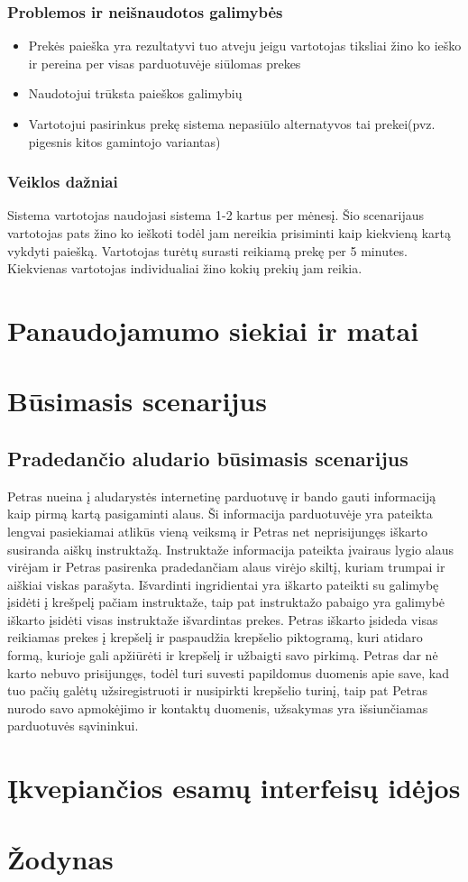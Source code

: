 \documentclass[oneside]{VUMIFPSkursinis}
\begin{document}
	\subsubsection{Problemos ir neišnaudotos galimybės}
		\begin{itemize}
			\item{Prekės paieška yra rezultatyvi tuo atveju jeigu vartotojas tiksliai žino ko ieško ir pereina per visas parduotuvėje siūlomas prekes}
			\item{Naudotojui trūksta paieškos galimybių}
			\item{Vartotojui pasirinkus prekę sistema nepasiūlo alternatyvos tai prekei(pvz. pigesnis kitos gamintojo variantas)}
		\end{itemize}
	\subsubsection{Veiklos dažniai}
		Sistema vartotojas naudojasi sistema 1-2 kartus per mėnesį.
		Šio scenarijaus vartotojas pats žino ko ieškoti todėl jam nereikia prisiminti kaip kiekvieną kartą vykdyti paiešką.
		Vartotojas turėtų surasti reikiamą prekę per 5 minutes.
		Kiekvienas vartotojas individualiai žino kokių prekių jam reikia.

\section{Panaudojamumo siekiai ir matai}

\section{Būsimasis scenarijus}
	\subsection{Pradedančio aludario būsimasis scenarijus}
		Petras nueina į aludarystės internetinę parduotuvę ir bando gauti informaciją kaip pirmą kartą pasigaminti alaus.
		Ši informacija parduotuvėje yra pateikta lengvai pasiekiamai atlikūs vieną veiksmą ir Petras net neprisijungęs iškarto susiranda aiškų instruktažą.
		Instruktaže informacija pateikta įvairaus lygio alaus virėjam ir Petras pasirenka pradedančiam alaus virėjo skiltį, kuriam trumpai ir aiškiai viskas parašyta.
		Išvardinti ingridientai yra iškarto pateikti su galimybę įsidėti į krešpelį pačiam instruktaže, taip pat instruktažo pabaigo yra galimybė iškarto įsidėti visas instruktaže išvardintas prekes.
		Petras iškarto įsideda visas reikiamas prekes į krepšelį ir paspaudžia krepšelio piktogramą, kuri atidaro formą, kurioje gali apžiūrėti ir krepšelį ir užbaigti savo pirkimą.
		Petras dar nė karto nebuvo prisijungęs, todėl turi suvesti papildomus duomenis apie save, kad tuo pačių galėtų užsiregistruoti ir nusipirkti krepšelio turinį, taip pat Petras nurodo savo apmokėjimo ir kontaktų duomenis, užsakymas yra išsiunčiamas parduotuvės sąvininkui.

\section{Įkvepiančios esamų interfeisų idėjos}

\section{Žodynas}
\end{document}
